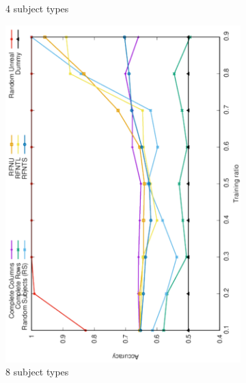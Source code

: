 \documentclass[10pt, conference, compsocconf]{IEEEtran}
\begin{document}
\begin{figure}
\begin{subfigure}[b]{0.4\linewidth}
        \caption{4 subject types}
\end{subfigure}
\begin{subfigure}[b]{0.4\linewidth}
        \includegraphics[width=0.8\columnwidth, angle=-90]{data/results/means_of_results/ALS/Synthetic/synthetic_subject_types/ALS-8-types.pdf}
        \caption{8 subject types}
\end{subfigure}
\begin{subfigure}[b]{0.4\linewidth}

\end{subfigure}
\end{figure}
\end{document}
